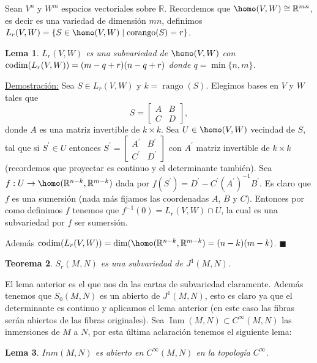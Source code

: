 \documentclass{report}
\newtheorem{theorem}{Teorema}[section]
\newtheorem{lem}[theorem]{Lema}
\theoremstyle{definition}
\DeclareMathOperator{\inm}{Inm}
\DeclareMathOperator{\rango}{rango}
\DeclareMathOperator{\cod}{codim}
\DeclareMathOperator{\cor}{corango}
\let\hom\homo
\DeclareMathOperator{\hom}{Hom}
\begin{document}
Sean $V^n$ y $W^m$ espacios vectoriales sobre $\mathbb{R}$. Recordemos que $\hom(V,W) \cong \mathbb{R}^{mn}$, es decir es una variedad de dimensi\'on $mn$, definimos $L_r (V,W) = \{ S \in \hom(V,W) \mid \cor (S) = r \}$.

\begin{lem}
$L_r (V,W)$ es una subvariedad de $\hom (V,W)$ con $\cod (L_r (V,W)) \\ = (m - q + r) (n - q +r)$ donde $q = \min \{ n , m \}$.
\end{lem}

\underline{Demostraci\'on:} Sea $S \in L_r (V,W)$ y $k = \rango (S)$. Elegimos bases en $V$ y $W$ tales que \[
S=
  \begin{bmatrix}
    A & B \\
    C & D
  \end{bmatrix} ,
\]
donde $A$ es una matriz invertible de $k \times k$. Sea $U \in \hom(V,W)$ vecindad de $S$, tal que si $S^\prime \in U$ entonces  $
S^\prime=
  \begin{bmatrix}
    A^\prime & B^\prime\\
    C^\prime & D^\prime
  \end{bmatrix}
$ con $A^\prime$ matriz invertible de $k \times k$ (recordemos que proyectar es continuo y el determinante tambi\'en). Sea $f: U \to \hom (\mathbb{R}^{n-k} , \mathbb{R}^{m-k})$ dada por $f(S^\prime) = D^\prime - C^\prime (A^\prime)^{-1} B^\prime$. Es claro que $f$ es una sumersi\'on (nada m\'as fijamos las coordenadas $A$, $B$ y $C$). Entonces por como definimos $f$ tenemos que $f^{-1} (0) = L_r (V,W) \cap U$, la cual es una subvariedad por $f $ ser sumersi\'on. 

Adem\'as $\cod (L_r (V,W)) = \dim (\hom (\mathbb{R}^{n-k} , \mathbb{R}^{m-k}) = (n - k ) (m-k)$. $\blacksquare$

\begin{theorem}
$S_r (M,N)$ es una subvariedad de $J^1 (M,N)$.
\end{theorem}

El lema anterior es el que nos da las cartas de subvariedad claramente. Adem\'as tenemos que $S_0 (M,N)$ es un abierto de $J^1 (M,N)$, esto es claro ya que el determinante es continuo y aplicamos el lema anterior (en este caso las fibras ser\'an abiertos de las fibras originales). Sea $\inm (M,N) \subset C^\infty (M,N)$ las inmersiones de $M$ a $N$, por esta \'ultima aclaraci\'on tenemos el siguiente lema:
\begin{lem}
$Inm (M,N) $ es abierto en $C^\infty(M,N)$ en la topolog\'ia $C^\infty$.
\end{lem}
\end{document}
